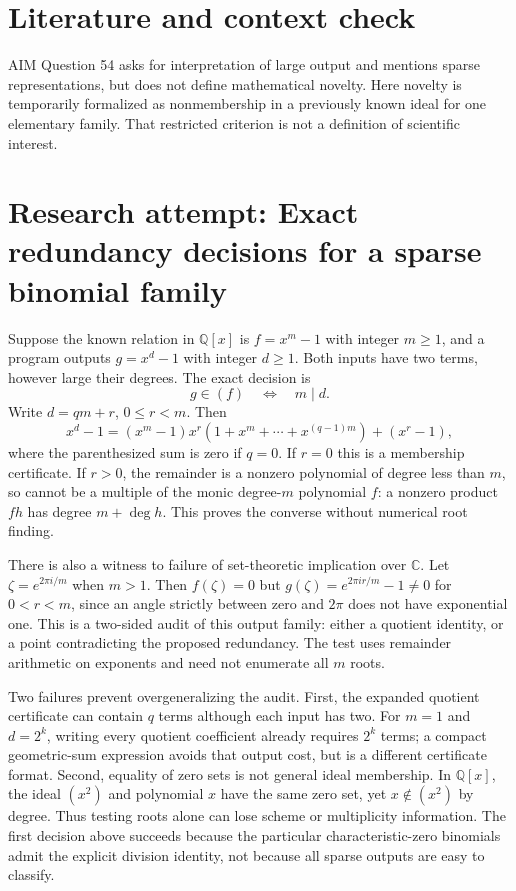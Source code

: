 \documentclass[11pt]{article}
\begin{document}
\section{Literature and context check}
AIM Question 54 asks for interpretation of large output and mentions sparse representations, but does not define mathematical novelty. Here novelty is temporarily formalized as nonmembership in a previously known ideal for one elementary family. That restricted criterion is not a definition of scientific interest.
\section{Research attempt: Exact redundancy decisions for a sparse binomial family}
Suppose the known relation in $\mathbb Q[x]$ is $f=x^m-1$ with integer $m\ge1$, and a program outputs $g=x^d-1$ with integer $d\ge1$. Both inputs have two terms, however large their degrees. The exact decision is
\[
g\in(f)\quad\Longleftrightarrow\quad m\mid d.
\]
Write $d=qm+r$, $0\le r<m$. Then
\[
x^d-1=(x^m-1)x^r(1+x^m+\cdots+x^{(q-1)m})+(x^r-1),
\]
where the parenthesized sum is zero if $q=0$. If $r=0$ this is a membership certificate. If $r>0$, the remainder is a nonzero polynomial of degree less than $m$, so cannot be a multiple of the monic degree-$m$ polynomial $f$: a nonzero product $fh$ has degree $m+\deg h$. This proves the converse without numerical root finding.

There is also a witness to failure of set-theoretic implication over $\mathbb C$. Let $\zeta=e^{2\pi i/m}$ when $m>1$. Then $f(\zeta)=0$ but $g(\zeta)=e^{2\pi i r/m}-1\ne0$ for $0<r<m$, since an angle strictly between zero and $2\pi$ does not have exponential one. This is a two-sided audit of this output family: either a quotient identity, or a point contradicting the proposed redundancy. The test uses remainder arithmetic on exponents and need not enumerate all $m$ roots.

Two failures prevent overgeneralizing the audit. First, the expanded quotient certificate can contain $q$ terms although each input has two. For $m=1$ and $d=2^k$, writing every quotient coefficient already requires $2^k$ terms; a compact geometric-sum expression avoids that output cost, but is a different certificate format. Second, equality of zero sets is not general ideal membership. In $\mathbb Q[x]$, the ideal $(x^2)$ and polynomial $x$ have the same zero set, yet $x\notin(x^2)$ by degree. Thus testing roots alone can lose scheme or multiplicity information. The first decision above succeeds because the particular characteristic-zero binomials admit the explicit division identity, not because all sparse outputs are easy to classify.
\end{document}
